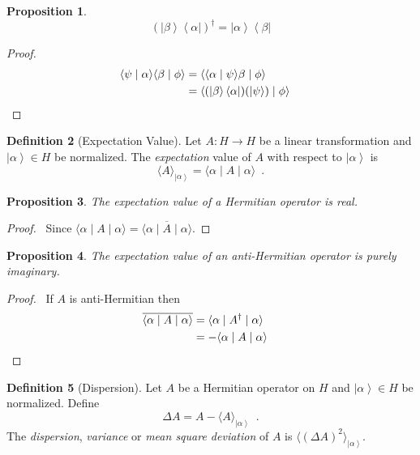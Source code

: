 \documentclass{book}
\let\qed\relax
\newtheorem{prop}{Proposition}[chapter]
\theoremstyle{definition}
\newtheorem{df}[prop]{Definition}
\newcommand{\bra}[1]{\ensuremath{\left\langle {#1} \right|}}
\newcommand{\ket}[1]{\ensuremath{\left| {#1} \right\rangle}}
\begin{document}
\begin{prop}
\[ (\ket{\beta} \bra{\alpha})^\dagger = \ket{\alpha} \bra{\beta} \]
\end{prop}

\begin{proof}
\pf
\begin{align*}
\langle \psi \mid \alpha \rangle \langle \beta \mid \phi \rangle
& = \langle \langle \alpha \mid \psi \rangle \beta \mid \phi \rangle \\
& = \langle (\ket{\beta} \bra{\alpha})(\ket{\psi}) \mid \phi \rangle & \qed
\end{align*}
\end{proof}

\begin{df}[Expectation Value]
Let $A : H \rightarrow H$ be a linear transformation and $\ket{\alpha} \in H$ be normalized. The \emph{expectation} value of $A$ with respect to $\ket{\alpha}$ is
\[ \langle A \rangle_{\ket{\alpha}} = \langle \alpha \mid A \mid \alpha \rangle \enspace . \]
\end{df}

\begin{prop}
The expectation value of a Hermitian operator is real.
\end{prop}

\begin{proof}
\pf\ Since $\langle \alpha \mid A \mid \alpha \rangle = \overline{\langle \alpha \mid A \mid \alpha \rangle}$. \qed
\end{proof}

\begin{prop}
The expectation value of an anti-Hermitian operator is purely imaginary.
\end{prop}

\begin{proof}
\pf\ If $A$ is anti-Hermitian then
\begin{align*}
\overline{\langle \alpha \mid A \mid \alpha \rangle}
& = \langle \alpha \mid A^\dagger \mid \alpha \rangle \\
& = - \langle \alpha \mid A \mid \alpha \rangle & \qed
\end{align*}
\end{proof}

\begin{df}[Dispersion]
Let $A$ be a Hermitian operator on $H$ and $\ket{\alpha} \in H$ be normalized. Define
\[ \Delta A = A - \langle A \rangle_{\ket{\alpha}} \enspace . \]
The \emph{dispersion}, \emph{variance} or \emph{mean square deviation} of $A$ is $\langle (\Delta A)^2 \rangle_{\ket{\alpha}}$.
\end{df}
\end{document}
